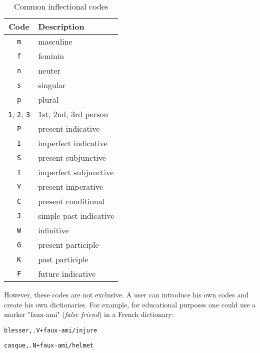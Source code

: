 \begin{table}[!ht]
\begin{center}
\begin{tabular}{|c|l|}
\hline
\textbf{Code} & \textbf{Description} \\
\hline
\verb+m+ & masculine \\
\hline
\verb+f+ & feminin \\
\hline
\verb+n+ & neuter \\
\hline
\verb+s+ & singular \\
\hline
\verb+p+ & plural \\
\hline
\verb+1+, \verb+2+, \verb+3+ & 1st, 2nd, 3rd person\\
\hline
\verb+P+ & present indicative \\
\hline
\verb+I+ & imperfect indicative  \\
\hline
\verb+S+ & present subjunctive \\
\hline
\verb+T+ & imperfect subjunctive  \\
\hline
\verb+Y+ & present imperative \\
\hline
\verb+C+ & present conditional \\
\hline
\verb+J+ & simple past indicative \\
\hline
\verb+W+ & infinitive \\
\hline
\verb+G+ & present participle \\
\hline
\verb+K+ & past participle \\
\hline
\verb+F+ & future indicative \\
\hline
\end{tabular}
\caption{Common inflectional codes\label{tab-inflectional-codes}}
\end{center}
\end{table}

\bigskip
\noindent However, these codes are not exclusive. A user can introduce his own codes
and create his own dictionaries. For example, for educational purposes one could
use a marker "faux-ami" (\textit{false friend}) in a French dictionary:

\bigskip
\noindent
\texttt{blesser,.V+faux-ami/injure}

\noindent
\texttt{casque,.N+faux-ami/helmet}

